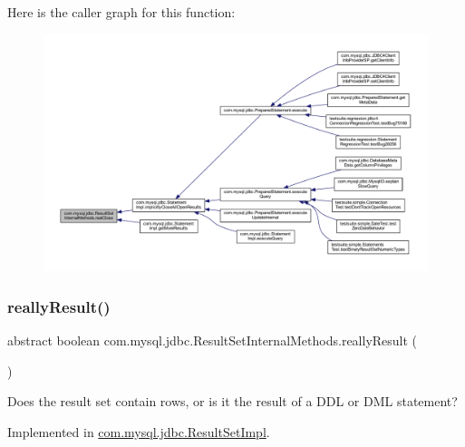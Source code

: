 Here is the caller graph for this function\+:
\nopagebreak
\begin{figure}[H]
\begin{center}
\leavevmode
\includegraphics[width=350pt]{interfacecom_1_1mysql_1_1jdbc_1_1_result_set_internal_methods_a04e640b79d91cb9a0eefecf583740187_icgraph}
\end{center}
\end{figure}
\mbox{\label{interfacecom_1_1mysql_1_1jdbc_1_1_result_set_internal_methods_a3e6296e287a3c596e1d63ca2d8fe9fc5}} 
\subsubsection{\texorpdfstring{really\+Result()}{reallyResult()}}
{\footnotesize\ttfamily abstract boolean com.\+mysql.\+jdbc.\+Result\+Set\+Internal\+Methods.\+really\+Result (\begin{DoxyParamCaption}{ }\end{DoxyParamCaption})\hspace{0.3cm}{\ttfamily [abstract]}}

Does the result set contain rows, or is it the result of a D\+DL or D\+ML statement? 

Implemented in \mbox{\hyperlink{classcom_1_1mysql_1_1jdbc_1_1_result_set_impl_aa8f663e9020bd6661b377d8314b74964}{com.\+mysql.\+jdbc.\+Result\+Set\+Impl}}.


